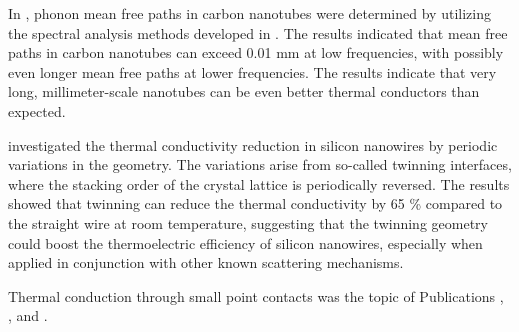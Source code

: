 In , phonon mean free paths in carbon nanotubes were determined by utilizing the spectral analysis methods developed in . The results indicated that mean free paths in carbon nanotubes can exceed 0.01 mm at low frequencies, with possibly even longer mean free paths at lower frequencies. The results indicate that very long, millimeter-scale nanotubes can be even better thermal conductors than expected. %
 
 investigated the thermal conductivity reduction in silicon nanowires by periodic variations in the geometry. The variations arise from so-called twinning interfaces, where the stacking order of the crystal lattice is periodically reversed. The results showed that twinning can reduce the thermal conductivity by 65 \% compared to the straight wire at room temperature, suggesting that the twinning geometry could boost the thermoelectric efficiency of silicon nanowires, especially when applied in conjunction with other known scattering mechanisms.

Thermal conduction through small point contacts was the topic of Publications , , and .






